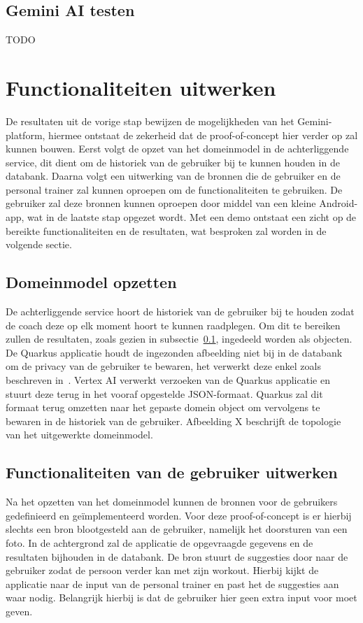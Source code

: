 \subsection{Gemini AI testen}
\label{subsec:gemini-ai-testen}
TODO %

\section{Functionaliteiten uitwerken}
\label{sec:functionaliteiten-uitwerken}
De resultaten uit de vorige stap bewijzen de mogelijkheden van het Gemini-platform, hiermee ontstaat de zekerheid dat de proof-of-concept hier verder op zal kunnen bouwen.
Eerst volgt de opzet van het domeinmodel in de achterliggende service, dit dient om de historiek van de gebruiker bij te kunnen houden in de databank.
Daarna volgt een uitwerking van de bronnen die de gebruiker en de personal trainer zal kunnen oproepen om de functionaliteiten te gebruiken.
De gebruiker zal deze bronnen kunnen oproepen door middel van een kleine Android-app, wat in de laatste stap opgezet wordt.
Met een demo ontstaat een zicht op de bereikte functionaliteiten en de resultaten, wat besproken zal worden in de volgende sectie.

\subsection{Domeinmodel opzetten}
\label{subsec:domeinmodel-opzetten}
De achterliggende service hoort de historiek van de gebruiker bij te houden zodat de coach deze op elk moment hoort te kunnen raadplegen.
Om dit te bereiken zullen de resultaten, zoals gezien in subsectie~\ref{subsec:gemini-ai-testen}, ingedeeld worden als objecten.
De Quarkus applicatie houdt de ingezonden afbeelding niet bij in de databank om de privacy van de gebruiker te bewaren, het verwerkt deze enkel zoals beschreven in~.
Vertex AI verwerkt verzoeken van de Quarkus applicatie en stuurt deze terug in het vooraf opgestelde JSON-formaat.
Quarkus zal dit formaat terug omzetten naar het gepaste domein object om vervolgens te bewaren in de historiek van de gebruiker.
Afbeelding X beschrijft de topologie van het uitgewerkte domeinmodel. %

\subsection{Functionaliteiten van de gebruiker uitwerken}
\label{subsec:functionaliteiten-van-de-gebruiker-uitwerken}
Na het opzetten van het domeinmodel kunnen de bronnen voor de gebruikers gedefinieerd en geïmplementeerd worden.
Voor deze proof-of-concept is er hierbij slechts een bron blootgesteld aan de gebruiker, namelijk het doorsturen van een foto.
In de achtergrond zal de applicatie de opgevraagde gegevens en de resultaten bijhouden in de databank.
De bron stuurt de suggesties door naar de gebruiker zodat de persoon verder kan met zijn workout.
Hierbij kijkt de applicatie naar de input van de personal trainer en past het de suggesties aan waar nodig.
Belangrijk hierbij is dat de gebruiker hier geen extra input voor moet geven.

